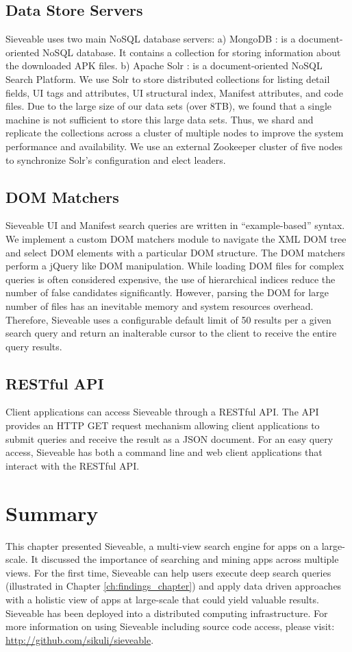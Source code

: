 \subsection{Data Store Servers}
Sieveable uses two main NoSQL database servers:
a) MongoDB \cite{mongodb}: is a document-oriented NoSQL database. It contains a collection for storing information about the downloaded APK files.
b) Apache Solr \cite{solr}: is a document-oriented NoSQL Search Platform.
We use Solr to store distributed collections for listing detail fields, UI tags and attributes, UI structural index, Manifest attributes, and code files.
Due to the large size of our data sets (over 8TB), we found that a single machine is not sufficient to store this large data sets.
Thus, we shard and replicate the collections across a cluster of multiple nodes to improve the system performance and availability.
We use an external Zookeeper \cite{zookeeper} cluster of five nodes to synchronize Solr's configuration and elect leaders.
\subsection{DOM Matchers}

Sieveable UI and Manifest search queries are written in  ``example-based'' syntax.
We implement a custom DOM matchers module to navigate the XML DOM tree and select DOM elements with a particular DOM structure.
The DOM matchers perform a jQuery like DOM manipulation.
While loading DOM files for complex queries is often considered expensive, the use of hierarchical indices reduce the number of false candidates significantly.
However, parsing the DOM for large number of files has an inevitable memory and system resources overhead.
Therefore, Sieveable uses a configurable default limit of 50 results per a given search query and return an inalterable cursor to the client to receive the entire query results.

\subsection{RESTful API}
Client applications can access Sieveable through a RESTful API.
The API provides an HTTP GET request mechanism allowing client applications to submit queries and receive the result as a JSON document.
For an easy query access, Sieveable has both a command line and web client applications that interact with the RESTful API.

\section{Summary}
This chapter presented Sieveable, a multi-view search engine for apps on a large-scale.
It discussed the importance of searching and mining apps across multiple views.
For the first time, Sieveable can help users execute deep search queries (illustrated in Chapter \ref{ch:findings_chapter}) and apply data driven approaches with a holistic view of apps at large-scale that could yield valuable results.
Sieveable has been deployed into a distributed computing infrastructure.
For more information on using Sieveable including source code access, please visit:
\url{http://github.com/sikuli/sieveable}.
